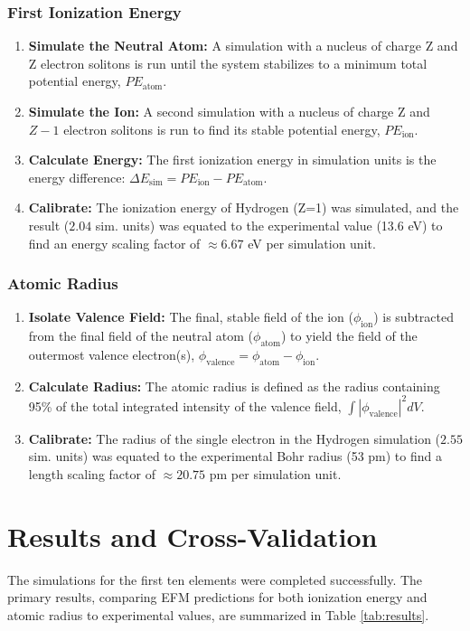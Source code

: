 \documentclass[11pt]{article}
\begin{document}
\subsubsection{First Ionization Energy}
\begin{enumerate}
    \item \textbf{Simulate the Neutral Atom:} A simulation with a nucleus of charge Z and Z electron solitons is run until the system stabilizes to a minimum total potential energy, \(PE_{\text{atom}}\).
    \item \textbf{Simulate the Ion:} A second simulation with a nucleus of charge Z and \(Z-1\) electron solitons is run to find its stable potential energy, \(PE_{\text{ion}}\).
    \item \textbf{Calculate Energy:} The first ionization energy in simulation units is the energy difference: \(\Delta E_{\text{sim}} = PE_{\text{ion}} - PE_{\text{atom}}\).
    \item \textbf{Calibrate:} The ionization energy of Hydrogen (Z=1) was simulated, and the result (\(2.04\) sim. units) was equated to the experimental value (13.6 eV) to find an energy scaling factor of \(\approx 6.67\) eV per simulation unit.
\end{enumerate}

\subsubsection{Atomic Radius}
\begin{enumerate}
    \item \textbf{Isolate Valence Field:} The final, stable field of the ion (\(\phi_{\text{ion}}\)) is subtracted from the final field of the neutral atom (\(\phi_{\text{atom}}\)) to yield the field of the outermost valence electron(s), \(\phi_{\text{valence}} = \phi_{\text{atom}} - \phi_{\text{ion}}\).
    \item \textbf{Calculate Radius:} The atomic radius is defined as the radius containing 95\% of the total integrated intensity of the valence field, \(\int |\phi_{\text{valence}}|^2 dV\).
    \item \textbf{Calibrate:} The radius of the single electron in the Hydrogen simulation (\(2.55\) sim. units) was equated to the experimental Bohr radius (53 pm) to find a length scaling factor of \(\approx 20.75\) pm per simulation unit.
\end{enumerate}

\section{Results and Cross-Validation}
The simulations for the first ten elements were completed successfully. The primary results, comparing EFM predictions for both ionization energy and atomic radius to experimental values, are summarized in Table \ref{tab:results}.
\end{document}
